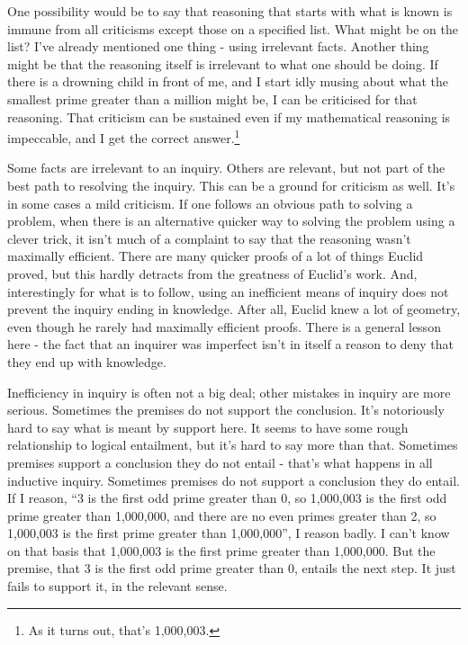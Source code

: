 \documentclass[
  10pt,
  letterpaper,
  twoside]{scrbook}
\begin{document}
One possibility would be to say that reasoning that starts with what is
known is immune from all criticisms except those on a specified list.
What might be on the list? I've already mentioned one thing - using
irrelevant facts. Another thing might be that the reasoning itself is
irrelevant to what one should be doing. If there is a drowning child in
front of me, and I start idly musing about what the smallest prime
greater than a million might be, I can be criticised for that reasoning.
That criticism can be sustained even if my mathematical reasoning is
impeccable, and I get the correct answer.\footnote{As it turns out,
  that's 1,000,003.}

Some facts are irrelevant to an inquiry. Others are relevant, but not
part of the best path to resolving the inquiry. This can be a ground for
criticism as well. It's in some cases a mild criticism. If one follows
an obvious path to solving a problem, when there is an alternative
quicker way to solving the problem using a clever trick, it isn't much
of a complaint to say that the reasoning wasn't maximally efficient.
There are many quicker proofs of a lot of things Euclid proved, but this
hardly detracts from the greatness of Euclid's work. And, interestingly
for what is to follow, using an inefficient means of inquiry does not
prevent the inquiry ending in knowledge. After all, Euclid knew a lot of
geometry, even though he rarely had maximally efficient proofs. There is
a general lesson here - the fact that an inquirer was imperfect isn't in
itself a reason to deny that they end up with knowledge.

Inefficiency in inquiry is often not a big deal; other mistakes in
inquiry are more serious. Sometimes the premises do not support the
conclusion. It's notoriously hard to say what is meant by support here.
It seems to have some rough relationship to logical entailment, but it's
hard to say more than that. Sometimes premises support a conclusion they
do not entail - that's what happens in all inductive inquiry. Sometimes
premises do not support a conclusion they do entail. If I reason, ``3 is
the first odd prime greater than 0, so 1,000,003 is the first odd prime
greater than 1,000,000, and there are no even primes greater than 2, so
1,000,003 is the first prime greater than 1,000,000'', I reason badly. I
can't know on that basis that 1,000,003 is the first prime greater than
1,000,000. But the premise, that 3 is the first odd prime greater than
0, entails the next step. It just fails to support it, in the relevant
sense.
\end{document}
